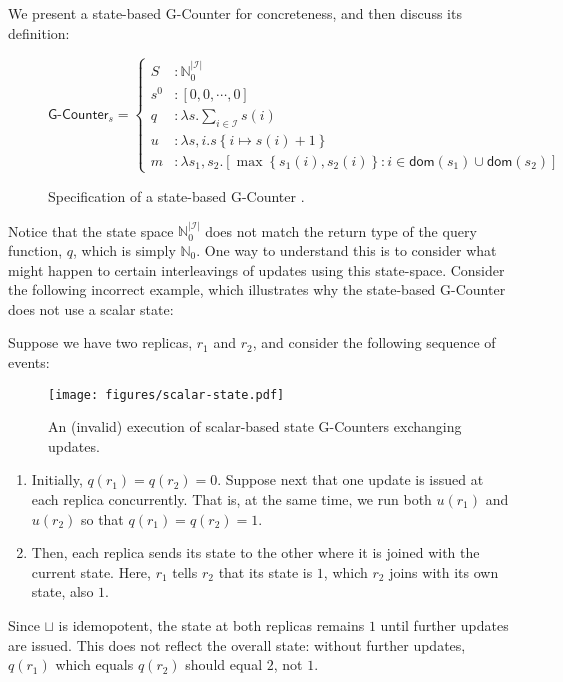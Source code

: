 We present a state-based G-Counter \CRDT for concreteness, and then discuss its
definition:

\begin{figure}[H]
  \centering
  \[
    \textsf{G-Counter}_s = \left\{\begin{aligned}
      S &: \mathbb{N}_0^{|\mathcal{I}|} \\
      s^0 &: \left[ 0, 0, \cdots, 0 \right] \\
      q &: \lambda s. \sum_{i \in \mathcal{I}} s(i) \\
      u &: \lambda s,i. s\left\{ i \mapsto s(i) + 1 \right\} \\
      m &: \lambda s_1, s_2. \left[ \max\left\{ s_1(i), s_2(i) \right\}: i \in \mathsf{dom}(s_1) \cup
      \mathsf{dom}(s_2) \right]
    \end{aligned}\right.
  \]
  \caption{Specification of a state-based \textsf{G-Counter} \CRDT.}
  \label{fig:state-gcounter}
\end{figure}

Notice that the state space $\mathbb{N}^{|\mathcal{I}|}_0$ does not match the
return type of the query function, $q$, which is simply $\mathbb{N}_0$. One way
to understand this is to consider what might happen to certain interleavings of
updates using this state-space. Consider the following incorrect example, which
illustrates why the state-based G-Counter does not use a scalar state:

\begin{example}
  \label{example:vector-state-counter}
  Suppose we have two replicas, $r_1$ and $r_2$, and consider the following
  sequence of events:

  \begin{figure}[H]
    \centering
    \texttt{[image: figures/scalar-state.pdf]}
    \caption{An (invalid) execution of scalar-based state G-Counters exchanging
      updates.}
  \end{figure}

  \begin{enumerate}
    \item Initially, $q(r_1) = q(r_2) = 0$. Suppose next that one update is
      issued at each replica concurrently. That is, at the same time, we run
      both $u(r_1)$ and $u(r_2)$ so that $q(r_1) = q(r_2) = 1$.
    \item Then, each replica sends its state to the other where it is joined
      with the current state. Here, $r_1$ tells $r_2$ that its state is $1$,
      which $r_2$ joins with its own state, also $1$.
  \end{enumerate}

  Since $\sqcup$ is idemopotent, the state at both replicas remains $1$ until
  further updates are issued. This does not reflect the overall state: without
  further updates, $q(r_1)$ which equals $q(r_2)$ should equal $2$, not $1$.
\end{example}

